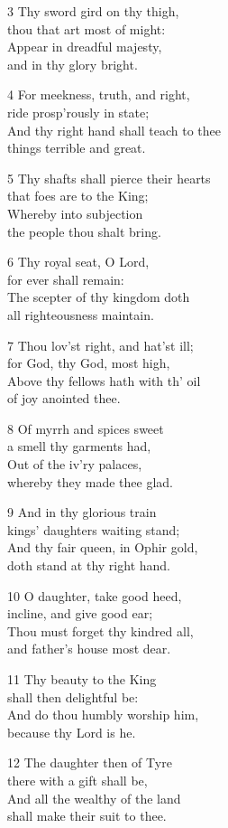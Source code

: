 3 Thy sword gird on thy thigh,\\
thou that art most of might:\\
Appear in dreadful majesty,\\
and in thy glory bright.

4 For meekness, truth, and right,\\
ride prosp’rously in state;\\
And thy right hand shall teach to thee\\
things terrible and great.

5 Thy shafts shall pierce their hearts\\
that foes are to the King;\\
Whereby into subjection\\
the people thou shalt bring.

6 Thy royal seat, O Lord,\\
for ever shall remain:\\
The scepter of thy kingdom doth\\
all righteousness maintain.

7 Thou lov’st right, and hat’st ill;\\
for God, thy God, most high,\\
Above thy fellows hath with th’ oil\\
of joy anointed thee.

8 Of myrrh and spices sweet\\
a smell thy garments had,\\
Out of the iv’ry palaces,\\
whereby they made thee glad.

9 And in thy glorious train\\
kings’ daughters waiting stand;\\
And thy fair queen, in Ophir gold,\\
doth stand at thy right hand.

10 O daughter, take good heed,\\
incline, and give good ear;\\
Thou must forget thy kindred all,\\
and father’s house most dear.

11 Thy beauty to the King\\
shall then delightful be:\\
And do thou humbly worship him,\\
because thy Lord is he.

12 The daughter then of Tyre\\
there with a gift shall be,\\
And all the wealthy of the land\\
shall make their suit to thee.

